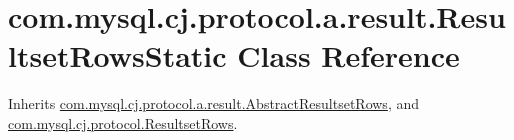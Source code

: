 \hypertarget{classcom_1_1mysql_1_1cj_1_1protocol_1_1a_1_1result_1_1_resultset_rows_static}{}\section{com.\+mysql.\+cj.\+protocol.\+a.\+result.\+Resultset\+Rows\+Static Class Reference}
\label{classcom_1_1mysql_1_1cj_1_1protocol_1_1a_1_1result_1_1_resultset_rows_static}


Inherits \mbox{\hyperlink{classcom_1_1mysql_1_1cj_1_1protocol_1_1a_1_1result_1_1_abstract_resultset_rows}{com.\+mysql.\+cj.\+protocol.\+a.\+result.\+Abstract\+Resultset\+Rows}}, and \mbox{\hyperlink{interfacecom_1_1mysql_1_1cj_1_1protocol_1_1_resultset_rows}{com.\+mysql.\+cj.\+protocol.\+Resultset\+Rows}}.

